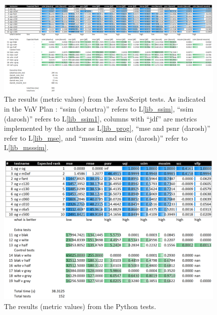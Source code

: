 \documentclass[12pt, titlepage]{article}
\newcommand{\lref}[1]{L\ref{#1}}
\begin{document}
\begin{landscape}
\vspace*{\fill}
\begin{figure}[h!]
  \begin{center}
  \includegraphics[width=22cm]{test-analysis/js-tests-results.png}
  \caption{The results (metric values) from the JavaScript tests.
  As indicated in the VnV Plan \cite{VnV_plan}:
  ``ssim (obartra)'' refers to \lref{lib_ssim}, ``ssim (darosh)'' refers to \lref{lib_ssim1},
  columns with ``jdf'' are metrics implemented by the author as \lref{lib_prog},
  ``mse and psnr (darosh)'' refer to \lref{lib_mse}, and
  ``msssim and ssim (darosh)'' refer to \lref{lib_msssim}.}
  \label{fig_js_results}
  \end{center}
\end{figure}
\vspace*{\fill}
\end{landscape}

\begin{figure}[h!]
  \begin{center}
  \includegraphics[width=1.0\textwidth]{test-analysis/py-tests-results.png}
  \caption{The results (metric values) from the Python tests.}
  \label{fig_py_results}
  \end{center}
\end{figure}
\end{document}
